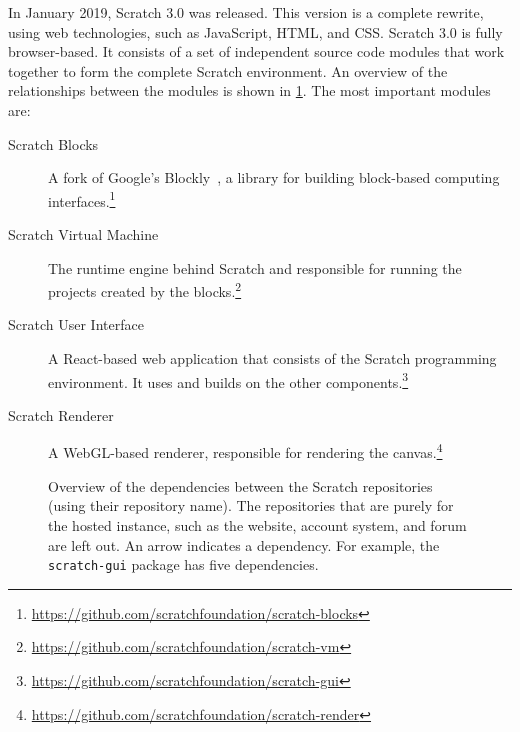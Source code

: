 \documentclass[../main]{subfiles}
\begin{document}
In January 2019, Scratch 3.0 was released.
This version is a complete rewrite, using web technologies, such as JavaScript, HTML, and CSS\@.
Scratch 3.0 is fully browser-based.
It consists of a set of independent source code modules that work together to form the complete Scratch environment.
An overview of the relationships between the modules is shown in \cref{fig:scratch-dependencies}.
The most important modules are:

\begin{description}
    \item[Scratch Blocks] A fork of Google's Blockly~\autocite{pasternakTipsCreatingBlock2017}, a library for building block-based computing interfaces.\footnote{\url{https://github.com/scratchfoundation/scratch-blocks}}
    \item[Scratch Virtual Machine] The runtime engine behind Scratch and responsible for running the projects created by the blocks.\footnote{\url{https://github.com/scratchfoundation/scratch-vm}}
    \item[Scratch User Interface] A React-based web application that consists of the Scratch programming environment.
        It uses and builds on the other components.\footnote{\url{https://github.com/scratchfoundation/scratch-gui}}
    \item[Scratch Renderer] A WebGL-based renderer, responsible for rendering the canvas.\footnote{\url{https://github.com/scratchfoundation/scratch-render}}
\end{description}

\footnotetext{}

\begin{figure}
    \begin{wide}
        
    \end{wide}
    \caption{
        Overview of the dependencies between the Scratch repositories (using their repository name).
        The repositories that are purely for the hosted instance, such as the website, account system, and forum are left out.
        An arrow indicates a dependency.
        For example, the \texttt{scratch-gui} package has five dependencies.
    }
    \label{fig:scratch-dependencies}
\end{figure}
\end{document}
